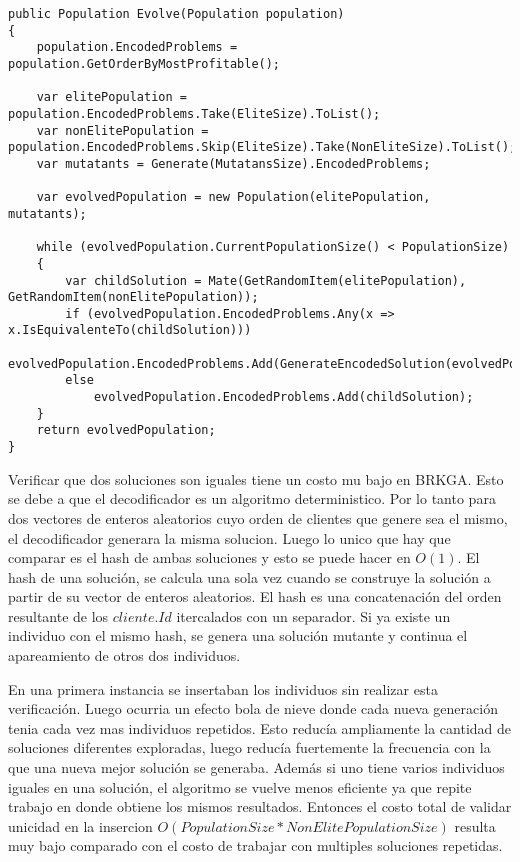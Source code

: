 \begin{lstlisting}
public Population Evolve(Population population)
{
    population.EncodedProblems = population.GetOrderByMostProfitable();

    var elitePopulation = population.EncodedProblems.Take(EliteSize).ToList();
    var nonElitePopulation = population.EncodedProblems.Skip(EliteSize).Take(NonEliteSize).ToList();
    var mutatants = Generate(MutatansSize).EncodedProblems;

    var evolvedPopulation = new Population(elitePopulation, mutatants);

    while (evolvedPopulation.CurrentPopulationSize() < PopulationSize)
    {
        var childSolution = Mate(GetRandomItem(elitePopulation), GetRandomItem(nonElitePopulation));
        if (evolvedPopulation.EncodedProblems.Any(x => x.IsEquivalenteTo(childSolution)))
            evolvedPopulation.EncodedProblems.Add(GenerateEncodedSolution(evolvedPopulation.EncodedProblems));
        else
            evolvedPopulation.EncodedProblems.Add(childSolution);
    }
    return evolvedPopulation;
}
\end{lstlisting}

Verificar que dos soluciones son iguales tiene un costo mu bajo en BRKGA. Esto se debe a que el decodificador es un algoritmo deterministico. Por lo tanto para dos vectores de enteros aleatorios cuyo orden de clientes que genere sea el mismo, el decodificador generara la misma solucion. Luego lo unico que hay que comparar es el hash de ambas soluciones y esto se puede hacer en $O(1)$. El hash de una solución, se calcula una sola vez cuando se construye la solución a partir de su vector de enteros aleatorios. El hash es una concatenación del orden resultante de los $cliente.Id$ itercalados con un separador. Si ya existe un individuo con el mismo hash, se genera una solución mutante y continua el apareamiento de otros dos individuos.

\bigskip

En una primera instancia se insertaban los individuos sin realizar esta verificación. Luego ocurria un efecto bola de nieve donde cada nueva generación tenia cada vez mas individuos repetidos. Esto reducía ampliamente la cantidad de soluciones diferentes exploradas, luego reducía fuertemente la frecuencia con la que una nueva mejor solución se generaba. Además si uno tiene varios individuos iguales en una solución, el algoritmo se vuelve menos eficiente ya que repite trabajo en donde obtiene los mismos resultados. Entonces el costo total de validar unicidad en la insercion $O(PopulationSize * NonElitePopulationSize)$ resulta muy bajo comparado con el costo de trabajar con multiples soluciones repetidas.

